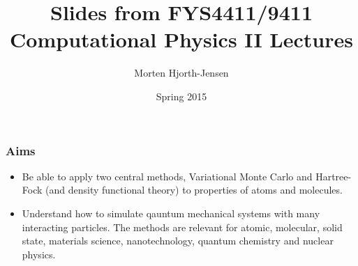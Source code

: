 \documentclass{beamer}
\begin{document}




\title{Slides from FYS4411/9411 Computational Physics II Lectures}


\author{Morten Hjorth-Jensen}

\date{Spring 2015
}

\begin{frame}
\titlepage
\end{frame}

\begin{frame}
\frametitle{Aims}

\begin{block}{}
\begin{itemize}
\item Be able to apply two central methods, Variational Monte Carlo and Hartree-Fock (and density functional theory) to properties of atoms and molecules.

\item Understand how to simulate qauntum mechanical systems with many interacting particles. The methods are relevant for atomic, molecular, solid state, materials science, nanotechnology, quantum chemistry  and nuclear physics. 
\end{itemize}

\noindent
\end{block}
\end{frame}
\end{document}
